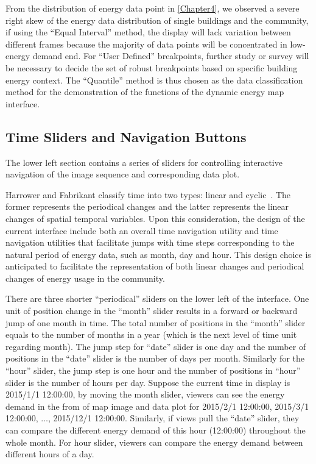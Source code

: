 From the distribution of energy data point in \cref{Chapter4}, we
observed a severe right skew of the energy data distribution of single
buildings and the community, if using the ``Equal Interval'' method,
the display will lack variation between different frames because the
majority of data points will be concentrated in low-energy demand
end. For ``User Defined'' breakpoints, further study or survey will be
necessary to decide the set of robust breakpoints based on specific
building energy context. The ``Quantile'' method is thus chosen as the
data classification method for the demonstration of the functions of
the dynamic energy map interface.

\subsection{Time Sliders and Navigation Buttons}
The lower left section contains a series of sliders for controlling
interactive navigation of the image sequence and corresponding data
plot. 

Harrower and Fabrikant classify time into two types: linear and
cyclic~\cite{Harrower2008}. The former represents the periodical
changes and the latter represents the linear changes of spatial
temporal variables. Upon this consideration, the design of the current
interface include both an overall time navigation utility and time
navigation utilities that facilitate jumps with time steps
corresponding to the natural period of energy data, such as month, day
and hour. This design choice is anticipated to facilitate the
representation of both linear changes and periodical changes of energy
usage in the community.

There are three shorter ``periodical'' sliders on the lower left of
the interface. One unit of position change in the ``month'' slider
results in a forward or backward jump of one month in time. The total
number of positions in the ``month'' slider equals to the number of
months in a year (which is the next level of time unit regarding
month).  The jump step for ``date'' slider is one day and the number
of positions in the ``date'' slider is the number of days per
month. Similarly for the ``hour'' slider, the jump step is one hour
and the number of positions in ``hour'' slider is the number of hours
per day. Suppose the current time in display is 2015/1/1 12:00:00, by
moving the month slider, viewers can see the energy demand in the from
of map image and data plot for 2015/2/1 12:00:00, 2015/3/1 12:00:00,
$\dots$, 2015/12/1 12:00:00. Similarly, if views pull the ``date''
slider, they can compare the different energy demand of this hour
(12:00:00) throughout the whole month. For hour slider, viewers can
compare the energy demand between different hours of a day.

